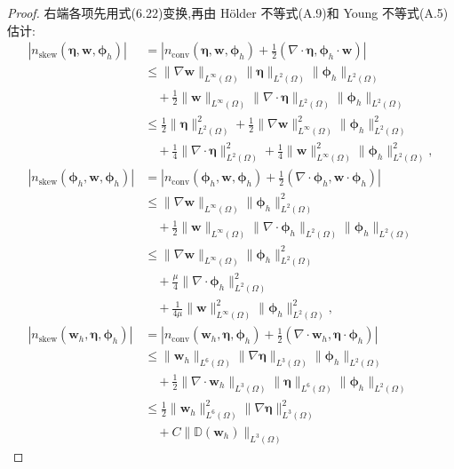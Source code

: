 \begin{theorem}
\begin{proof}
右端各项先用式(6.22)变换,再由 Hölder 不等式(A.9)和 Young 不等式(A.5)估计:
\[
\begin{aligned}
|n_{\mathrm{skew}}(\symbf{\eta},\bm{w},\symbf{\phi}_h)|
&=\left|n_{\mathrm{conv}}(\symbf{\eta},\bm{w},\symbf{\phi}_h)
 +\frac12(\nabla\cdot\symbf{\eta},
           \symbf{\phi}_h\cdot\bm{w})\right|\\
&\le\|\nabla\bm{w}\|_{L^\infty(\Omega)}
 \|\symbf{\eta}\|_{L^2(\Omega)}
 \|\symbf{\phi}_h\|_{L^2(\Omega)}\\
&\quad+\frac12\|\bm{w}\|_{L^\infty(\Omega)}
 \|\nabla\cdot\symbf{\eta}\|_{L^2(\Omega)}
 \|\symbf{\phi}_h\|_{L^2(\Omega)}\\
&\le\frac12\|\symbf{\eta}\|_{L^2(\Omega)}^2
 +\frac12\|\nabla\bm{w}\|_{L^\infty(\Omega)}^2
 \|\symbf{\phi}_h\|_{L^2(\Omega)}^2\\
&\quad+\frac14\|\nabla\cdot\symbf{\eta}\|_{L^2(\Omega)}^2
 +\frac14\|\bm{w}\|_{L^\infty(\Omega)}^2
 \|\symbf{\phi}_h\|_{L^2(\Omega)}^2,
\\[2mm]
|n_{\mathrm{skew}}(\symbf{\phi}_h,\bm{w},\symbf{\phi}_h)|
&=\left|n_{\mathrm{conv}}(\symbf{\phi}_h,\bm{w},\symbf{\phi}_h)
 +\frac12(\nabla\cdot\symbf{\phi}_h,
           \bm{w}\cdot\symbf{\phi}_h)\right|\\
&\le\|\nabla\bm{w}\|_{L^\infty(\Omega)}
 \|\symbf{\phi}_h\|_{L^2(\Omega)}^2\\
&\quad+\frac12\|\bm{w}\|_{L^\infty(\Omega)}
 \|\nabla\cdot\symbf{\phi}_h\|_{L^2(\Omega)}
 \|\symbf{\phi}_h\|_{L^2(\Omega)}\\
&\le\|\nabla\bm{w}\|_{L^\infty(\Omega)}
 \|\symbf{\phi}_h\|_{L^2(\Omega)}^2\\
&\quad+\frac\mu4\|\nabla\cdot\symbf{\phi}_h\|_{L^2(\Omega)}^2\\
&\quad+\frac1{4\mu}\|\bm{w}\|_{L^\infty(\Omega)}^2
 \|\symbf{\phi}_h\|_{L^2(\Omega)}^2,
\\[2mm]
|n_{\mathrm{skew}}(\bm{w}_h,\symbf{\eta},\symbf{\phi}_h)|
&=\left|n_{\mathrm{conv}}(\bm{w}_h,\symbf{\eta},\symbf{\phi}_h)
 +\frac12(\nabla\cdot\bm{w}_h,
           \symbf{\eta}\cdot\symbf{\phi}_h)\right|\\
&\le\|\bm{w}_h\|_{L^6(\Omega)}
 \|\nabla\symbf{\eta}\|_{L^3(\Omega)}
 \|\symbf{\phi}_h\|_{L^2(\Omega)}\\
&\quad+\frac12\|\nabla\cdot\bm{w}_h\|_{L^3(\Omega)}
 \|\symbf{\eta}\|_{L^6(\Omega)}
 \|\symbf{\phi}_h\|_{L^2(\Omega)}\\
&\le\frac12\|\bm{w}_h\|_{L^6(\Omega)}^2
 \|\nabla\symbf{\eta}\|_{L^3(\Omega)}^2\\
&\quad+C\|\mathbb{D}(\bm{w}_h)\|_{L^3(\Omega)}

\end{aligned}\]
\end{proof}
\end{theorem}
